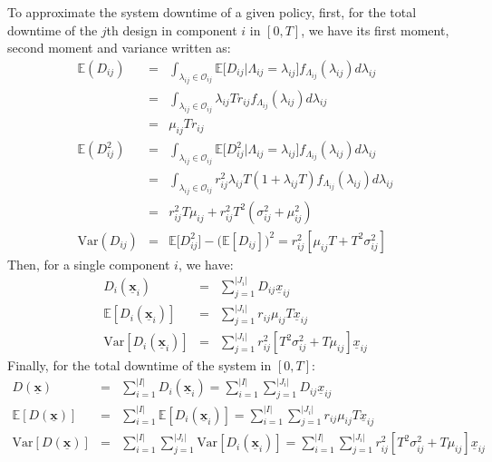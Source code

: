 \documentclass[preprint,12pt]{elsarticle}
\begin{document}
To approximate the system downtime of a given policy, first, for the total downtime of the $j$th design in component $i$ in $[0, T]$, we have its first moment, second moment and variance written as:
\begin{eqnarray}
\mathbb{E}(D_{ij}) &=& \int_{\lambda_{ij}\in \mathcal O_{ij}}\mathbb{E}\bigg[D_{ij} \bigg\vert \Lambda_{ij}=\lambda_{ij}\bigg]f_{\Lambda_{ij}}(\lambda_{ij})d\lambda_{ij} \nonumber\\
 &=& \int_{\lambda_{ij}\in \mathcal O_{ij} } \lambda_{ij}T r_{ij}f_{\Lambda_{ij}}(\lambda_{ij})d\lambda_{ij} \nonumber\\
 &=& \mu_{ij} T r_{ij}\\
\mathbb{E}(D^{2}_{ij}) &=& \int_{\lambda_{ij}\in \mathcal O_{ij}}\mathbb{E}\bigg[D^{2}_{ij} \bigg\vert \Lambda_{ij}=\lambda_{ij}\bigg]f_{\Lambda_{ij}}(\lambda_{ij})d\lambda_{ij}  \nonumber\\
&=& \int_{\lambda_{ij}\in \mathcal O_{ij}} {r^{2}_{ij}\lambda_{ij}T(1+\lambda_{ij}T)f_{\Lambda_{ij}}(\lambda_{ij})d\lambda_{ij}} \nonumber\\
&=& r^{2}_{ij}T\mu_{ij} + r^{2}_{ij}T^{2}(\sigma^{2}_{ij}+\mu^{2}_{ij}) \\
\textrm{Var}(D_{ij})&=&\mathbb{E}\bigg[D^{2}_{ij}\bigg] - \bigg(\mathbb{E}[D_{ij}]\bigg)^{2}=r^{2}_{ij}[\mu_{ij}T + T^{2}\sigma^{2}_{ij}]
\end{eqnarray}
Then, for a single component $i$, we have:
\begin{eqnarray}
D_{i}(\boldsymbol{\underline{x}}_{i}) &=& \sum_{j=1}^{\lvert J_{i}\rvert}{D_{ij}\underline{x}_{ij}}\\
\mathbb{E}[D_{i}(\boldsymbol{\underline{x}}_{i})] &=&\sum_{j=1}^{\lvert J_{i} \rvert}{r_{ij}\mu_{ij}T\underline{x}_{ij}} \\
\textrm{Var}[D_{i}(\boldsymbol{\underline{x}}_{i})]&=&\sum_{j=1}^{\lvert J_{i} \rvert}{r_{ij}^{2}[T^{2}\sigma^{2}_{ij}+T\mu_{ij}]\underline{x}_{ij}}
\end{eqnarray}
Finally, for the total downtime of the system in $[0, T]$:
\begin{eqnarray}
D(\boldsymbol{\underline{x}}) &=& \sum_{i=1}^{\lvert I \rvert}D_{i}(\boldsymbol{\underline{x}}_{i})
=\sum_{i=1}^{\lvert I \rvert}\sum_{j=1}^{\lvert J_{i}\rvert}{D_{ij}\underline{x}_{ij}}  \\
\mathbb{E}[D(\boldsymbol{\underline{x}})] &=& \sum^{\lvert I \rvert}_{i=1}\mathbb{E}[D_{i}(\boldsymbol{\underline{x}}_{i})] = \sum^{\lvert I \rvert}_{i=1} \sum_{j=1}^{\lvert J_{i} \rvert}{r_{ij}\mu_{ij}T\underline{x}_{ij}} \label{expdowntime}\\
\textrm{Var}[D(\boldsymbol{\underline{x}})] &=& \sum_{i=1}^{\lvert I \rvert} \sum_{j=1}^{\lvert J_{i} \rvert}\textrm{Var}[D_{i}(\boldsymbol{\underline{x}}_{i})] = \sum_{i=1}^{\lvert I \rvert}\sum_{j=1}^{\lvert J_{i} \rvert}r_{ij}^{2}[T^{2}\sigma^{2}_{ij}+T\mu_{ij}]\underline{x}_{ij}
\end{eqnarray}
\end{document}
